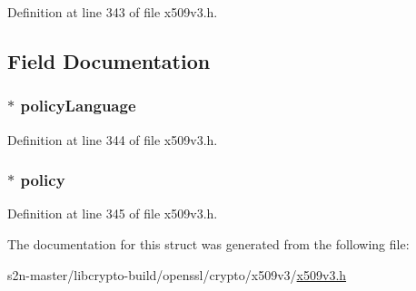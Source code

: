 Definition at line 343 of file x509v3.\+h.



\subsection{Field Documentation}
\subsubsection[{\texorpdfstring{policy\+Language}{policyLanguage}}]{ $\ast$ policy\+Language}\hypertarget{struct_p_r_o_x_y___p_o_l_i_c_y__st_a6efaaaa93de35a9476adaba965a32327}{}\label{struct_p_r_o_x_y___p_o_l_i_c_y__st_a6efaaaa93de35a9476adaba965a32327}


Definition at line 344 of file x509v3.\+h.

\subsubsection[{\texorpdfstring{policy}{policy}}]{ $\ast$ policy}\hypertarget{struct_p_r_o_x_y___p_o_l_i_c_y__st_a813a5b5250ba75a1ae765bbb50521474}{}\label{struct_p_r_o_x_y___p_o_l_i_c_y__st_a813a5b5250ba75a1ae765bbb50521474}


Definition at line 345 of file x509v3.\+h.



The documentation for this struct was generated from the following file\+:\begin{DoxyCompactItemize}
\item 
s2n-\/master/libcrypto-\/build/openssl/crypto/x509v3/\hyperlink{crypto_2x509v3_2x509v3_8h}{x509v3.\+h}\end{DoxyCompactItemize}

